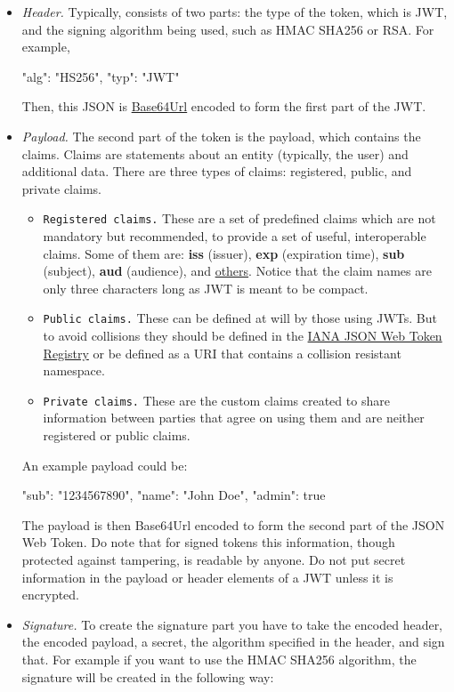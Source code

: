 \begin{itemize}
    \item \textit{Header.} Typically, consists of two parts: the type of the token, which is JWT, and the signing algorithm
    being used, such as HMAC SHA256 or RSA\@.
    For example,

    \begin{spverbatim}
    {
        "alg": "HS256",
        "typ": "JWT"
    }
    \end{spverbatim}

    Then, this JSON is \href{https://en.wikipedia.org/wiki/Base64}{Base64Url} encoded to form the first part of the JWT\@.
    \item \textit{Payload.} The second part of the token is the payload, which contains the claims.
    Claims are statements about an entity (typically, the user) and additional data.
    There are three types of claims: registered, public, and private claims.
    \begin{itemize}
        \item \texttt{Registered claims.} These are a set of predefined claims which are not mandatory but recommended,
        to provide a set of useful, interoperable claims.
        Some of them are: \textbf{iss} (issuer), \textbf{exp} (expiration time), \textbf{sub} (subject),
        \textbf{aud} (audience), and \href{https://tools.ietf.org/html/rfc7519#section-4.1}{others}.
        Notice that the claim names are only three characters long as JWT is meant to be compact.
        \item \texttt{Public claims.} These can be defined at will by those using JWTs. But to avoid collisions they
        should be defined in the \href{https://www.iana.org/assignments/jwt/jwt.xhtml}{IANA JSON Web Token Registry}
        or be defined as a URI that contains a collision resistant namespace.
        \item \texttt{Private claims.} These are the custom claims created to share information between parties that
        agree on using them and are neither registered or public claims.
    \end{itemize}
    An example payload could be:

    \begin{spverbatim}
    {
        "sub": "1234567890",
        "name": "John Doe",
        "admin": true
    }
    \end{spverbatim}

    The payload is then Base64Url encoded to form the second part of the JSON Web Token.
    Do note that for signed tokens this information, though protected against tampering, is readable by anyone.
    Do not put secret information in the payload or header elements of a JWT unless it is encrypted.
    \item \textit{Signature.} To create the signature part you have to take the encoded header, the encoded payload, a secret,
    the algorithm specified in the header, and sign that.
    For example if you want to use the HMAC SHA256 algorithm, the signature will be created in the following way:


\end{itemize}
